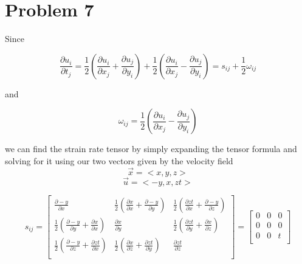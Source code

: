 \documentclass[11pt,a4paper,english]{article}
\numberwithin{equation}{section}
\begin{document}
\section{Problem 7}

Since 

\[ \frac{\partial u_{i}}{\partial t_{j}}
   = \frac{1}{2} \left( \frac{\partial u_i}{\partial x_j}
      + \frac{\partial u_j}{\partial y_i}
       \right) +
       \frac{1}{2} \left( \frac{\partial u_i}{\partial x_j}
      - \frac{\partial u_j}{\partial y_i}
       \right) = 
       s_{ij} + \frac{1}{2}\omega_{ij}\]
       
and 

\[\omega_{ij}= 
\frac{1}{2} \left( \frac{\partial u_i}{\partial x_j}
      - \frac{\partial u_j}{\partial y_i}
       \right)\]
       
we can find the strain rate tensor by simply expanding the tensor formula and solving for it using our two vectors given by the velocity field
\[\vec{x}= <x, y, z>\] \[\vec{u}=<-y, x, zt>\]

\[s_{ij}=
\begin{bmatrix}
       \frac{\partial -y}{\partial x} & 
       \frac{1}{2}(\frac{\partial x}{\partial x} + \frac{\partial -y}{\partial y}) & 
       \frac{1}{2}(\frac{\partial zt}{\partial x} + \frac{\partial -y}{\partial z}) \\[0.3em]
       
       \frac{1}{2}(\frac{\partial -y}{\partial y} + \frac{\partial x}{\partial x}) & 
       \frac{\partial x}{\partial y} & 
       \frac{1}{2}(\frac{\partial zt}{\partial y} + \frac{\partial x}{\partial z}) \\[0.3em]
       
       \frac{1}{2}(\frac{\partial -y}{\partial z} + \frac{\partial zt}{\partial x}) & 
       \frac{1}{2}(\frac{\partial x}{\partial z} + \frac{\partial zt}{\partial y}) & 
       \frac{\partial zt}{\partial z} \\[0.3em]
     \end{bmatrix}
     =\begin{bmatrix}
       0 & 
       0 & 
       0\\[0.3em]
       
       0 & 
       0 & 
       0\\[0.3em]
       
       0 & 
       0 & 
       t\\[0.3em]
     \end{bmatrix}\]
     
\end{document}

